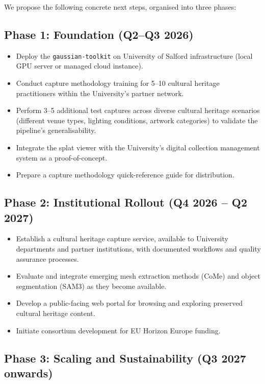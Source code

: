 We propose the following concrete next steps, organised into three phases:

\subsection{Phase 1: Foundation (Q2--Q3 2026)}

\begin{itemize}
  \item Deploy the \texttt{gaussian-toolkit} on University of Salford infrastructure (local GPU server or managed cloud instance).
  \item Conduct capture methodology training for 5--10 cultural heritage practitioners within the University's partner network.
  \item Perform 3--5 additional test captures across diverse cultural heritage scenarios (different venue types, lighting conditions, artwork categories) to validate the pipeline's generalisability.
  \item Integrate the splat viewer with the University's digital collection management system as a proof-of-concept.
  \item Prepare a capture methodology quick-reference guide for distribution.
\end{itemize}

\subsection{Phase 2: Institutional Rollout (Q4 2026 -- Q2 2027)}

\begin{itemize}
  \item Establish a cultural heritage capture service, available to University departments and partner institutions, with documented workflows and quality assurance processes.
  \item Evaluate and integrate emerging mesh extraction methods (CoMe) and object segmentation (SAM3) as they become available.
  \item Develop a public-facing web portal for browsing and exploring preserved cultural heritage content.
  \item Initiate consortium development for EU Horizon Europe funding.
\end{itemize}

\subsection{Phase 3: Scaling and Sustainability (Q3 2027 onwards)}

